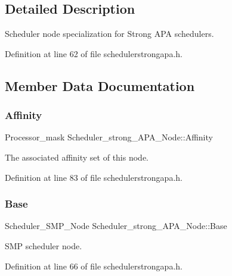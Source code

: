 \subsection{Detailed Description}
Scheduler node specialization for Strong A\+PA schedulers. 

Definition at line 62 of file schedulerstrongapa.\+h.



\subsection{Member Data Documentation}
\mbox{\label{structScheduler__strong__APA__Node_a7672e477658785808b0069f11bc4d24e}} 
\subsubsection{\texorpdfstring{Affinity}{Affinity}}
{\footnotesize\ttfamily Processor\+\_\+mask Scheduler\+\_\+strong\+\_\+\+A\+P\+A\+\_\+\+Node\+::\+Affinity}



The associated affinity set of this node. 



Definition at line 83 of file schedulerstrongapa.\+h.

\mbox{\label{structScheduler__strong__APA__Node_ae86cbf5fd8743267abe33bed6d8b0fe6}} 
\subsubsection{\texorpdfstring{Base}{Base}}
{\footnotesize\ttfamily Scheduler\+\_\+\+S\+M\+P\+\_\+\+Node Scheduler\+\_\+strong\+\_\+\+A\+P\+A\+\_\+\+Node\+::\+Base}



S\+MP scheduler node. 



Definition at line 66 of file schedulerstrongapa.\+h.

